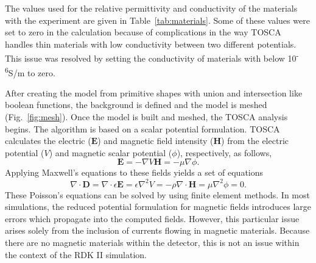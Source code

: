 \documentclass[oneside,12pt]{memoir}
\begin{document}
The values used for the relative permittivity and conductivity of the materials with the experiment are given in Table~\ref{tab:materials}. Some of these values were set to zero in the calculation because of complications in the way TOSCA handles thin materials with low conductivity between two different potentials. This issue was resolved by setting the conductivity of materials with below 10\textsuperscript{-6}S/m to zero.\par
After creating the model from primitive shapes with union and intersection like boolean functions, the background is defined and the model is meshed (Fig.~\ref{fig:mesh}). Once the model is built and meshed, the TOSCA analysis begins. The algorithm is based on a scalar potential formulation. TOSCA calculates the electric ($\mathbf{E}$) and magnetic field intensity ($\mathbf{H}$) from the electric potential ($V$) and magnetic scalar potential ($\phi$), respectively, as follows,
\begin{subequations}
	\begin{equation}
		\mathbf{E}=-\nabla V
	\end{equation}
	\begin{equation}
		\mathbf{H}=-\mu\nabla\phi
	\end{equation}.
\end{subequations}
Applying Maxwell's equations to these fields yields a set of equations
\begin{subequations}
	\begin{equation}
		\nabla\cdot\mathbf{D}=\nabla\cdot\epsilon\mathbf{E}=\epsilon\nabla^2 V=-\rho
	\end{equation}
	\begin{equation}
		\nabla\cdot\mathbf{H}=\mu\nabla^2\phi=0.
	\end{equation}
\end{subequations}
These Poisson's equations can be solved by using finite element methods. In most simulations, the reduced potential formulation for magnetic fields introduces large errors which propagate into the computed fields. However, this particular issue arises solely from the inclusion of currents flowing in magnetic materials. Because there are no magnetic materials within the detector, this is not an issue within the context of the RDK II simulation.
\end{document}
